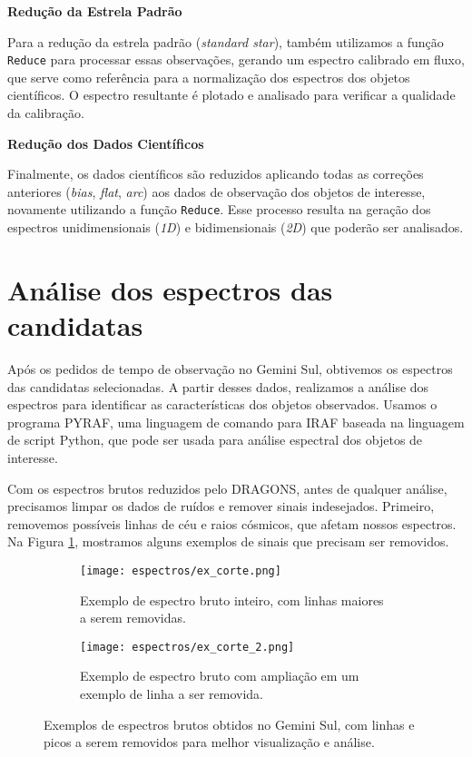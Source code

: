 \textbf{Redução da Estrela Padrão}

Para a redução da estrela padrão (\textit{standard star}), também utilizamos a função \verb|Reduce| para processar essas observações, gerando um espectro calibrado em fluxo, que serve como referência para a normalização dos espectros dos objetos científicos. O espectro resultante é plotado e analisado para verificar a qualidade da calibração.

\textbf{Redução dos Dados Científicos}

Finalmente, os dados científicos são reduzidos aplicando todas as correções anteriores (\textit{bias}, \textit{flat}, \textit{arc}) aos dados de observação dos objetos de interesse, novamente utilizando a função \verb|Reduce|. Esse processo resulta na geração dos espectros unidimensionais (\textit{1D}) e bidimensionais (\textit{2D}) que poderão ser analisados.

\section{Análise dos espectros das candidatas}\label{sec:analise_espectros}
Após os pedidos de tempo de observação no Gemini Sul, obtivemos os espectros das candidatas selecionadas. A partir desses dados, realizamos a análise dos espectros para identificar as características dos objetos observados. Usamos o programa PYRAF, uma linguagem de comando para IRAF baseada na linguagem de script Python, que pode ser usada para análise espectral dos objetos de interesse.

Com os espectros brutos reduzidos pelo DRAGONS, antes de qualquer análise, precisamos limpar os dados de ruídos e remover sinais indesejados. Primeiro, removemos possíveis linhas de céu e raios cósmicos, que afetam nossos espectros. Na Figura \ref{exemplo_remocao_linhas_ceu}, mostramos alguns exemplos de sinais que precisam ser removidos.

\begin{figure}[!ht]
    \centering
    \captionsetup{justification=centering}
    \begin{subfigure}[b]{0.65\textwidth}
        \texttt{[image: espectros/ex\_corte.png]}
        \caption{Exemplo de espectro bruto inteiro, com linhas maiores a serem removidas.}
    \end{subfigure}
    \begin{subfigure}[b]{0.65\textwidth}
        \texttt{[image: espectros/ex\_corte\_2.png]}
        \caption{Exemplo de espectro bruto com ampliação em um exemplo de linha a ser removida.}
    \end{subfigure}
    \caption{Exemplos de espectros brutos obtidos no Gemini Sul, com linhas e picos a serem removidos para melhor visualização e análise.}
    \label{exemplo_remocao_linhas_ceu}
\end{figure}

